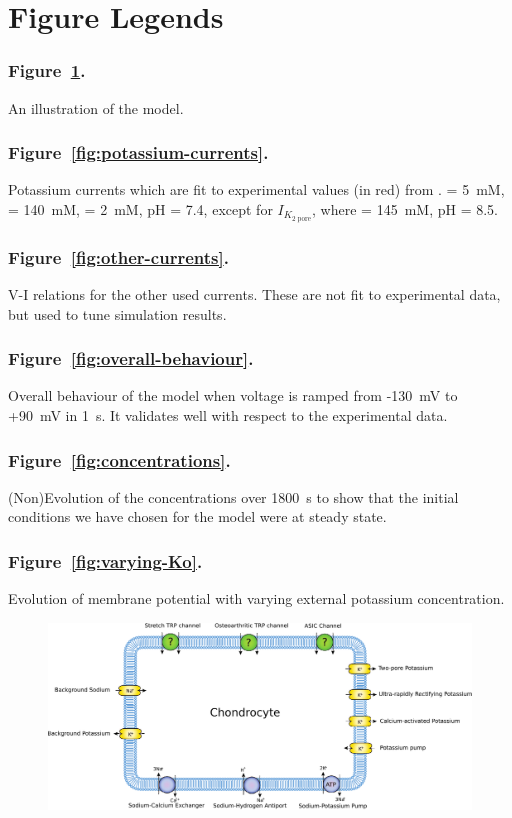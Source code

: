 \section*{Figure Legends}
\label{figures}

\subsubsection*{Figure~\ref{fig:chondrocyte-model}.}
An illustration of the model.


\subsubsection*{Figure~\ref{fig:potassium-currents}.}
Potassium currents which are fit to experimental values (in red) from
\cite{Clarketal2011}. \Ko = 5~mM, \Nao = 140~mM, \Cao = 2~mM, pH = 7.4,
except for $I_{K_{\mathrm{2\; pore}}}$, where \Ko = 145~mM, pH = 8.5.


\subsubsection*{Figure~\ref{fig:other-currents}.}
V-I relations for the other used currents. These are not fit to
experimental data, but used to tune simulation results.

\subsubsection*{Figure~\ref{fig:overall-behaviour}.}
Overall behaviour of the model when voltage is ramped from -130~mV to
+90~mV in 1~s. It validates well with respect to the experimental data.

\subsubsection*{Figure~\ref{fig:concentrations}.}
(Non)Evolution of the concentrations over 1800~s to show that the
initial conditions we have chosen for the model were at steady state.

\subsubsection*{Figure~\ref{fig:varying-Ko}.}
Evolution of membrane potential with varying external potassium
concentration.

\clearpage
\begin{figure}
  \centering
  \includegraphics[width=\textwidth]
  {../images/pdf/chondrocyte-model-cellml}
  \caption{}
  \label{fig:chondrocyte-model}
\end{figure}

